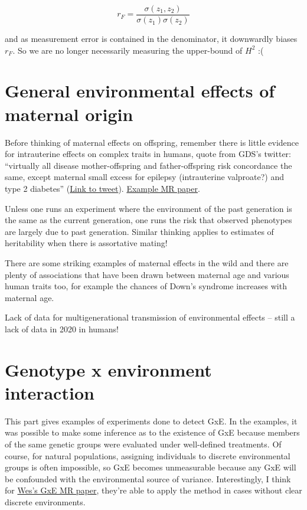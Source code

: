 \documentclass[
]{book}
\begin{document}
\begin{equation}
  r_F = \frac{\sigma(z_1, z_2)} {\sigma(z_1)\sigma(z_2)}
  \label{eq:falconer-repeatability}
\end{equation}

and as measurement error is contained in the denominator, it downwardly biases \(r_F\). So we are no longer necessarily measuring the upper-bound of \(H^2\) :(

\hypertarget{general-environmental-effects-of-maternal-origin}{%
\section{General environmental effects of maternal origin}\label{general-environmental-effects-of-maternal-origin}}

Before thinking of maternal effects on offspring, remember there is little evidence for intrauterine effects on complex traits in humans, quote from GDS's twitter: ``virtually all disease mother-offspring and father-offspring risk concordance the same, except maternal small excess for epilepsy (intrauterine valproate?) and type 2 diabetes'' (\href{https://twitter.com/mendel_random/status/1261221722344357889}{Link to tweet}). \href{https://www.medrxiv.org/content/10.1101/2020.05.04.20091173v1.full}{Example MR paper}.

Unless one runs an experiment where the environment of the past generation is the same as the current generation, one runs the risk that observed phenotypes are largely due to past generation. Similar thinking applies to estimates of heritability when there is assortative mating!

There are some striking examples of maternal effects in the wild and there are plenty of associations that have been drawn between maternal age and various human traits too, for example the chances of Down's syndrome increases with maternal age.

Lack of data for multigenerational transmission of environmental effects -- still a lack of data in 2020 in humans!

\hypertarget{genotype-x-environment-interaction}{%
\section{Genotype x environment interaction}\label{genotype-x-environment-interaction}}

This part gives examples of experiments done to detect GxE. In the examples, it was possible to make some inference as to the existence of GxE because members of the same genetic groups were evaluated under well-defined treatments. Of course, for natural populations, assigning individuals to discrete environmental groups is often impossible, so GxE becomes unmeasurable because any GxE will be confounded with the environmental source of variance. Interestingly, I think for \href{https://academic.oup.com/ije/article/48/3/702/5193695}{Wes's GxE MR paper}, they're able to apply the method in cases without clear discrete environments.
\end{document}
